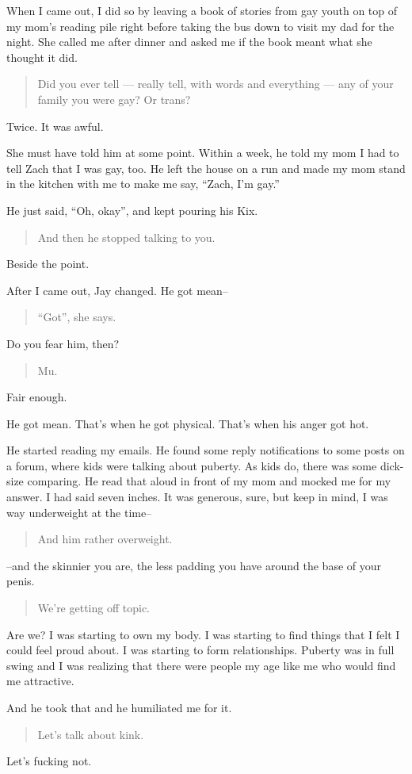 When I came out, I did so by leaving a book of stories from gay youth on top of my mom's reading pile right before taking the bus down to visit my dad for the night. She called me after dinner and asked me if the book meant what she thought it did.

\begin{quote}
Did you ever tell --- really tell, with words and everything --- any of your family you were gay? Or trans?
\end{quote}

Twice. It was awful.

She must have told him at some point. Within a week, he told my mom I had to tell Zach that I was gay, too. He left the house on a run and made my mom stand in the kitchen with me to make me say, ``Zach, I'm gay.''

He just said, ``Oh, okay'', and kept pouring his Kix.

\begin{quote}
And then he stopped talking to you.
\end{quote}

Beside the point.

After I came out, Jay changed. He got mean--

\begin{quote}
``Got'', she says.
\end{quote}

Do you fear him, then?

\begin{quote}
Mu.
\end{quote}

Fair enough.

He got mean. That's when he got physical. That's when his anger got hot.

He started reading my emails. He found some reply notifications to some posts on a forum, where kids were talking about puberty. As kids do, there was some dick-size comparing. He read that aloud in front of my mom and mocked me for my answer. I had said seven inches. It was generous, sure, but keep in mind, I was way underweight at the time--

\begin{quote}
And him rather overweight.
\end{quote}

--and the skinnier you are, the less padding you have around the base of your penis.

\begin{quote}
We're getting off topic.
\end{quote}

Are we? I was starting to own my body. I was starting to find things that I felt I could feel proud about. I was starting to form relationships. Puberty was in full swing and I was realizing that there were people my age like me who would find me attractive.

And he took that and he humiliated me for it.

\begin{quote}
Let's talk about kink.
\end{quote}

Let's fucking not.
